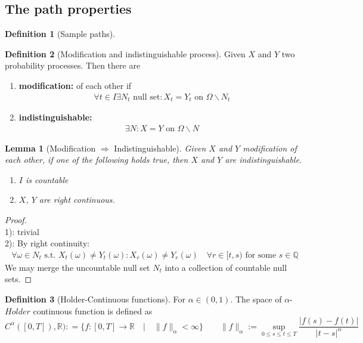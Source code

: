 \documentclass[a4paper,11pt]{book}
\newtheorem{lemma}[theorem]{Lemma}
\theoremstyle{definition}
\newtheorem{definition}{Definition}[section]
\theoremstyle{remark}
\begin{document}
\subsection{The path properties}
\begin{definition}[Sample paths]
\end{definition}

\begin{definition}[Modification and indistinguishable process]
Given $X$ and $Y$ two probability processes. Then there are
\begin{enumerate}
	\item \textbf{modification:} of each other if 
	\begin{align*}
		\forall t \in I \exists N_t \text{ null set}: X_t = Y_t \text{ on } \Omega \backslash N_t
	\end{align*}
	\item \textbf{indistinguishable:}
	\begin{align*}
		\exists N: X = Y \text{ on } \Omega \backslash N 
	\end{align*}
\end{enumerate}
\end{definition}

\begin{lemma}[Modification $\Rightarrow$ Indistinguishable]
	Given $X$ and $Y$ modification of each other, if one of the following holds true, then $X$ and $Y$ are indistinguishable. 
	\begin{enumerate}
		\item $I$ is countable
		\item $X$, $Y$ are right continuous. 
	\end{enumerate}
\end{lemma}
\begin{proof}\quad\\
1): trivial\\
2): By right continuity:
\begin{align*}
	\forall \omega \in N_t\text{ s.t. } X_t(\omega) \neq Y_t(\omega): X_r(\omega) \neq Y_r(\omega) \quad \forall r \in [t, s) \text{ for some } s \in \mathbb{Q}
\end{align*}	
We may merge the uncountable null set $N_t$ into a collection of countable null sets. 
\end{proof}



\begin{definition}[Holder-Continuous functions]
For $\alpha \in (0, 1)$. The space of $\alpha$-$Holder$ continuous function is defined as 
\begin{equation*}
	C^\alpha([0, T]), \mathbb{R}) : = \{f : [0, T] \rightarrow \mathbb{R} \quad| \quad \|f\|_\alpha < \infty\}      \qquad
	\|f\|_\alpha:= \sup_{0 \leq s \leq t \leq T} \frac{|f(s) - f(t)|}{|t - s|^\alpha}
\end{equation*}	
\end{definition}
\end{document}
